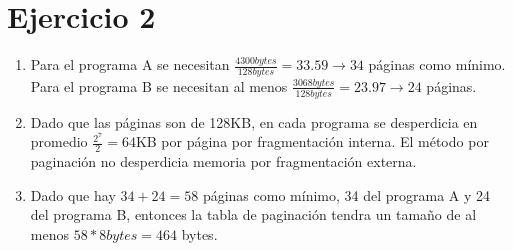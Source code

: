 \documentclass[12pt]{article}
\begin{document}
	\section*{Ejercicio 2}
	\begin{enumerate}[label=\alph*)]
		\item Para el programa A se necesitan $\frac{4300 bytes}{128 bytes} = 33.59 \rightarrow 34$ páginas como mínimo. Para el programa B se necesitan al menos $\frac{3068 bytes}{128 bytes} = 23.97 \rightarrow 24$ páginas.
		\item Dado que las páginas son de 128KB, en cada programa se desperdicia en promedio $\frac{2^{7}}{2}= 64$KB por página por fragmentación interna. El método por paginación no desperdicia memoria por fragmentación externa.
		\item Dado que hay $34 + 24 = 58$ páginas como mínimo, 34 del programa A y 24 del programa B, entonces la tabla de paginación tendra un tamaño de al menos $58 * 8 bytes = 464$ bytes.
	\end{enumerate}
\end{document}
